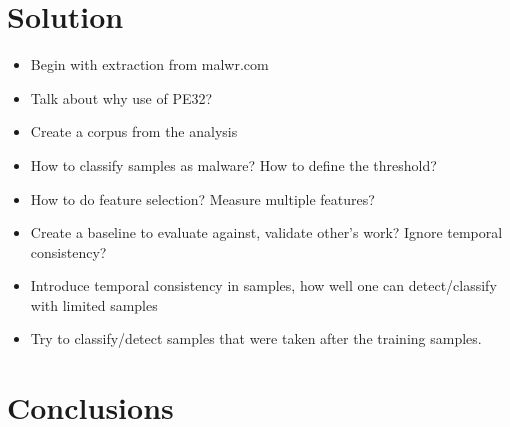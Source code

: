 \documentclass{llncs}
\begin{document}

\section{Solution}\label{sec_solution}

\begin{itemize}
	\item Begin with extraction from malwr.com
	\item Talk about why use of PE32?
	\item Create a corpus from the analysis
	\item How to classify samples as malware? How to define the threshold?
	\item How to do feature selection? Measure multiple features?
	\item Create a baseline to evaluate against, validate other's work? Ignore temporal consistency?
	\item Introduce temporal consistency in samples, how well one can detect/classify with limited samples
	\item Try to classify/detect samples that were taken after the training samples.
\end{itemize}



\section{Conclusions}\label{sec_conclusions}


\begin{thebibliography}{}

\end{thebibliography}
\end{document}
